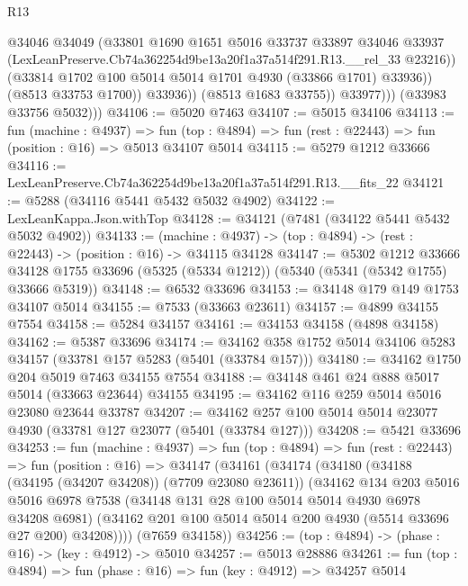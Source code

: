 \begin{lexlean}{R13}
\begin{coremodule}
                        @34046
                        @34049
                        (@33801
                          @1690
                          @1651
                          @5016
                          @33737
                          @33897
                          @34046
                          @33937
                          (LexLeanPreserve.Cb74a362254d9be13a20f1a37a514f291.R13.__rel_33 @23216))
                        (@33814 @1702 @100 @5014 @5014 @1701 @4930 (@33866 @1701) @33936))
                      (@8513 @33753 @1700))
                    @33936))
                (@8513 @1683 @33755))
              @33977)))
        (@33983 @33756 @5032)))
@34106 := @5020 @7463
@34107 := @5015 @34106
@34113 := fun (machine : @4937) =>
  fun (top : @4894) => fun (rest : @22443) => fun (position : @16) => @5013 @34107 @5014
@34115 := @5279 @1212 @33666
@34116 := LexLeanPreserve.Cb74a362254d9be13a20f1a37a514f291.R13.__fits_22
@34121 := @5288 (@34116 @5441 @5432 @5032 @4902)
@34122 := LexLeanKappa.Json.withTop
@34128 := @34121 (@7481 (@34122 @5441 @5432 @5032 @4902))
@34133 := (machine : @4937) -> (top : @4894) -> (rest : @22443) -> (position : @16) -> @34115 @34128
@34147 := @5302
    @1212
    @33666
    @34128
    @1755
    @33696
    (@5325 (@5334 @1212))
    (@5340 (@5341 (@5342 @1755) @33666 @5319))
@34148 := @6532 @33696
@34153 := @34148 @179 @149 @1753 @34107 @5014
@34155 := @7533 (@33663 @23611)
@34157 := @4899 @34155 @7554
@34158 := @5284 @34157
@34161 := @34153 @34158 (@4898 @34158)
@34162 := @5387 @33696
@34174 := @34162 @358 @1752 @5014 @34106 @5283 @34157 (@33781 @157 @5283 (@5401 (@33784 @157)))
@34180 := @34162 @1750 @204 @5019 @7463 @34155 @7554
@34188 := @34148 @461 @24 @888 @5017 @5014 (@33663 @23644) @34155
@34195 := @34162 @116 @259 @5014 @5016 @23080 @23644 @33787
@34207 := @34162 @257 @100 @5014 @5014 @23077 @4930 (@33781 @127 @23077 (@5401 (@33784 @127)))
@34208 := @5421 @33696
@34253 := fun (machine : @4937) =>
  fun (top : @4894) =>
  fun (rest : @22443) =>
  fun (position : @16) =>
  @34147
    (@34161
      (@34174
        (@34180
          (@34188 (@34195 (@34207 @34208)) (@7709 @23080 @23611))
          (@34162
            @134
            @203
            @5016
            @5016
            @6978
            @7538
            (@34148 @131 @28 @100 @5014 @5014 @4930 @6978 @34208 @6981)
            (@34162 @201 @100 @5014 @5014 @200 @4930 (@5514 @33696 @27 @200) @34208))))
      (@7659 @34158))
@34256 := (top : @4894) -> (phase : @16) -> (key : @4912) -> @5010
@34257 := @5013 @28886
@34261 := fun (top : @4894) => fun (phase : @16) => fun (key : @4912) => @34257 @5014

\end{coremodule}
\end{lexlean}

